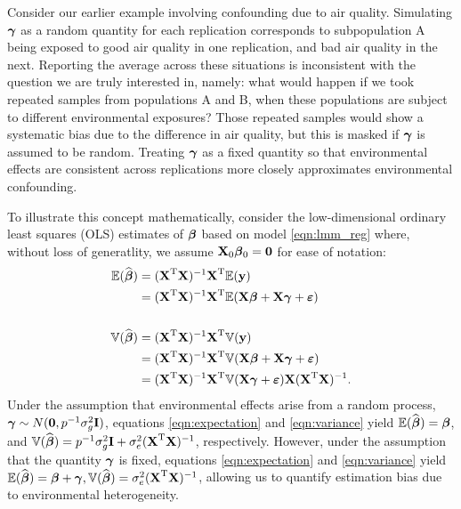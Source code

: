 Consider our earlier example involving confounding due to air quality. Simulating $\boldsymbol{\gamma}$ as a random quantity for each replication corresponds to subpopulation A being exposed to good air quality in one replication, and bad air quality in the next. Reporting the average across these situations is inconsistent with the question we are truly interested in, namely: what would happen if we took repeated samples from populations A and B, when these populations are subject to different environmental exposures? Those repeated samples would show a systematic bias due to the difference in air quality, but this is masked if $\boldsymbol{\gamma}$ is assumed to be random. Treating $\boldsymbol{\gamma}$ as a fixed quantity so that environmental effects are consistent across replications more closely approximates environmental confounding.



To illustrate this concept mathematically, consider the low-dimensional ordinary least squares (OLS) estimates of $\boldsymbol{\beta}{}$ based on model \eqref{eqn:lmm_reg} where, without loss of generatlity, we assume $\textbf{X}_0 \boldsymbol{\beta}{}_0 = \boldsymbol{0}$ for ease of notation: 
\begin{align}
    \mathbb{E}(\widehat{\boldsymbol{\beta}{}}) &= (\textbf{X}^{\text{T}} \textbf{X})^{-1} \textbf{X}^{\text{T}} \mathbb{E}(\textbf{y}) \notag \\
    &=  (\textbf{X}^{\text{T}} \textbf{X})^{-1} \textbf{X}^{\text{T}} \mathbb{E}(\textbf{X}\boldsymbol{\beta}{} + \textbf{X}\boldsymbol{\gamma} + \boldsymbol{\varepsilon}{}) \label{eqn:expectation}\\
    &\quad \notag\\
    \mathbb{V}(\widehat{\boldsymbol{\beta}{}}) &= (\textbf{X}^{\text{T}} \textbf{X})^{-1} \textbf{X}^{\text{T}} \mathbb{V}(\textbf{y}) \notag\\
    &=  (\textbf{X}^{\text{T}} \textbf{X})^{-1} \textbf{X}^{\text{T}} \mathbb{V}(\textbf{X}\boldsymbol{\beta}{} + \textbf{X}\boldsymbol{\gamma} + \boldsymbol{\varepsilon}{}) \notag\\
    &=  (\textbf{X}^{\text{T}} \textbf{X})^{-1} \textbf{X}^{\text{T}} \mathbb{V}(\textbf{X}\boldsymbol{\gamma} + \boldsymbol{\varepsilon}{}) \textbf{X}  (\textbf{X}^{\text{T}} \textbf{X})^{-1} \label{eqn:variance}.
\end{align}
Under the assumption that environmental effects arise from a random process, $\boldsymbol{\gamma} \sim N(\boldsymbol{0}, p^{-1} \sigma^2_g \textbf{I})$, equations \eqref{eqn:expectation} and \eqref{eqn:variance} yield $\mathbb{E}(\widehat{\boldsymbol{\beta}{}}) = \boldsymbol{\beta}{}$, and $\mathbb{V}(\widehat{\boldsymbol{\beta}{}}) = p^{-1}\sigma^2_g\textbf{I} + \sigma^2_e (\textbf{X}^{\text{T}} \textbf{X})^{-1}$, respectively. However, under the assumption that the quantity $\boldsymbol{\gamma}$ is fixed, equations \eqref{eqn:expectation} and \eqref{eqn:variance} yield $\mathbb{E}(\widehat{\boldsymbol{\beta}{}}) = \boldsymbol{\beta}{} + \boldsymbol{\gamma}, \mathbb{V}(\widehat{\boldsymbol{\beta}{}}) = \sigma^2_e (\textbf{X}^{\text{T}} \textbf{X})^{-1}$, allowing us to quantify estimation bias due to environmental heterogeneity. 

